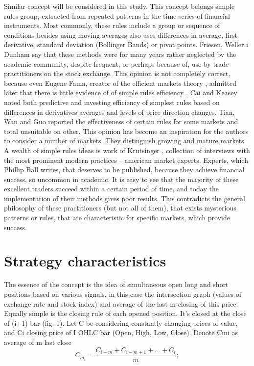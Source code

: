 \documentclass{tewiart}
\begin{document}
Similar concept will be considered in this study. This concept belongs simple rules group, extracted from repeated patterns in the time series of financial instruments. Most commonly, these rules include a group or sequence of conditions besides using moving averages also uses differences in average, first derivative, standard deviation (Bollinger Bands) or pivot points. Friesen, Weller i Dunham \cite{friesen09} say that these methods were for many years rather neglected by the academic community, despite frequent, or perhaps because of, use by trade practitioners on the stock exchange. This opinion is not completely correct, because even Eugene Fama, creator of the efficient markets theory \cite{fama91}, admitted later that  there is little evidence of of simple rules efficiency \cite{fama98}. Cai and Keasey \cite{cai05} noted both predictive and investing efficiency of simplest rules based on differences in derivatives averages and levels of price direction changes. Tian, Wan and Guo \cite{tian02} reported the effectiveness of certain rules for some markets and total unsuitable on other. This opinion has become an inspiration for the authors to consider a number of markets. They distinguish growing and mature markets. A wealth of simple rules ideas is work of Krutsinger \cite{krutsinger99}, collection of interviews with the most prominent modern practices – american market experts. Experts, which Phillip Ball \cite{ball07} writes, that deserves to be published, because they achieve financial success, so uncommon in academic.
It is easy to see that the majority of these excellent traders succeed within a certain period of time, and today the implementation of their methods gives poor results. This contradicts the general philosophy of these practitioners (but not all of them), that exists mysterious patterns or rules, that are characteristic for specific markets, which provide success.
\section{Strategy characteristics}
\indent The essence of the concept is the idea of simultaneous open long and short positions based on various signals, in this case the intersection graph (values of exchange rate  and stock index) and average of the last m closing of this price.\\
Equally simple is the closing rule of each opened position. It's closed at the close of (i+1) bar (fig. 1).
Let C be considering constantly changing prices of value, and Ci closing price of I OHLC bar (Open, High, Low, Close). Denote Cmi as average of m last close
\begin{equation} \label{label-of-equation-1}
  C_{m_{i}} = \frac{C_{i-m} + C_{i-m+1} + … + C_{i}}{m}; 
\end{equation}
\end{document}
